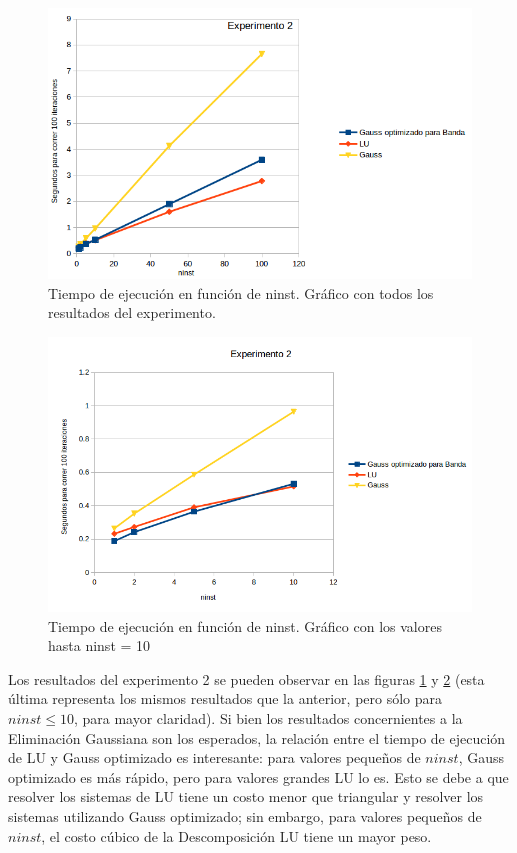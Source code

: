 \begin{figure}[ht]
\begin{center}
\includegraphics[width=0.8\columnwidth]{../src/experimentos/exp1-3/exp2figuratodos}
\caption{Tiempo de ejecuci\'on en funci\'on de ninst. Gr\'afico con todos los resultados del experimento.}
\label{fig:figura2}
\end{center}
\end{figure}

\begin{figure}[ht]
\begin{center}
\includegraphics[width=0.8\columnwidth]{../src/experimentos/exp1-3/exp2figurahasta10}
\caption{Tiempo de ejecuci\'on en funci\'on de ninst. Gr\'afico con los valores hasta ninst = 10}
\label{fig:figura3}
\end{center}
\end{figure}


\par Los resultados del experimento 2 se pueden observar en las figuras \ref{fig:figura2} y \ref{fig:figura3} (esta \'ultima representa los mismos resultados que la anterior, pero s\'olo para $ninst\leq10$, para mayor claridad).
Si bien los resultados concernientes a la Eliminaci\'on Gaussiana son los esperados, la relaci\'on entre el tiempo de ejecuci\'on de LU y Gauss optimizado es interesante: para valores peque\~nos de $ninst$, Gauss optimizado es m\'as r\'apido, pero para valores grandes LU lo es.
Esto se debe a que resolver los sistemas de LU tiene un costo menor que triangular y resolver los sistemas utilizando Gauss optimizado; sin embargo, para valores peque\~nos de $ninst$, el costo c\'ubico de la Descomposici\'on LU tiene un mayor peso.

